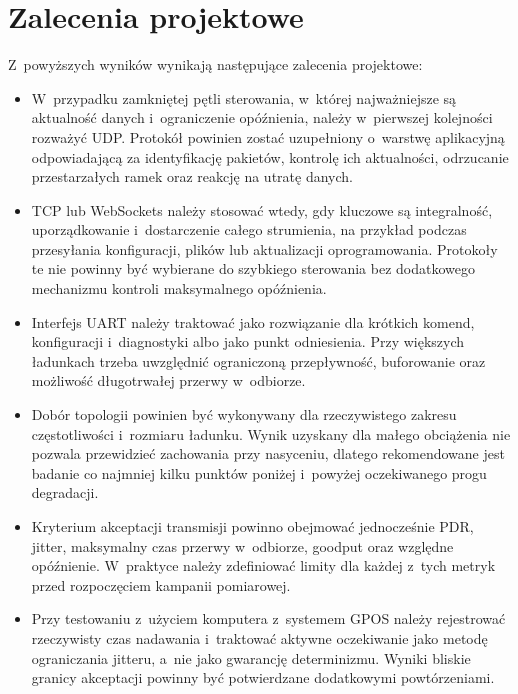\section{Zalecenia projektowe}

Z~powyższych wyników wynikają następujące zalecenia projektowe:

\begin{itemize}
    \item W~przypadku zamkniętej pętli sterowania, w~której najważniejsze są aktualność danych i~ograniczenie opóźnienia, należy w~pierwszej kolejności rozważyć UDP.
          Protokół powinien zostać uzupełniony o~warstwę aplikacyjną odpowiadającą za identyfikację pakietów, kontrolę ich aktualności, odrzucanie przestarzałych ramek oraz reakcję na utratę danych.

    \item TCP lub WebSockets należy stosować wtedy, gdy kluczowe są integralność, uporządkowanie i~dostarczenie całego strumienia, na przykład podczas przesyłania konfiguracji, plików lub aktualizacji oprogramowania.
          Protokoły te nie powinny być wybierane do szybkiego sterowania bez dodatkowego mechanizmu kontroli maksymalnego opóźnienia.

    \item Interfejs UART należy traktować jako rozwiązanie dla krótkich komend, konfiguracji i~diagnostyki albo jako punkt odniesienia.
          Przy większych ładunkach trzeba uwzględnić ograniczoną przepływność, buforowanie oraz możliwość długotrwałej przerwy w~odbiorze.

    \item Dobór topologii powinien być wykonywany dla rzeczywistego zakresu częstotliwości i~rozmiaru ładunku.
          Wynik uzyskany dla małego obciążenia nie pozwala przewidzieć zachowania przy nasyceniu, dlatego rekomendowane jest badanie co najmniej kilku punktów poniżej i~powyżej oczekiwanego progu degradacji.

    \item Kryterium akceptacji transmisji powinno obejmować jednocześnie PDR, jitter, maksymalny czas przerwy w~odbiorze, goodput oraz względne opóźnienie.
          W~praktyce należy zdefiniować limity dla każdej z~tych metryk przed rozpoczęciem kampanii pomiarowej.

    \item Przy testowaniu z~użyciem komputera z~systemem GPOS należy rejestrować rzeczywisty czas nadawania i~traktować aktywne oczekiwanie jako metodę ograniczania jitteru, a~nie jako gwarancję determinizmu.
          Wyniki bliskie granicy akceptacji powinny być potwierdzane dodatkowymi powtórzeniami.
\end{itemize}

